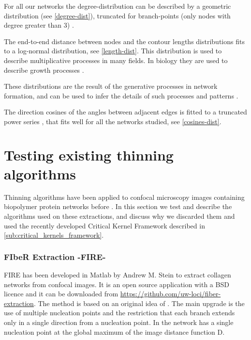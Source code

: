 For all our networks the degree-distribution can be described by a geometric distribution (see \autoref{degree-dist}), truncated for branch-points (only nodes with degree greater than 3) .

The end-to-end distance between nodes and the contour lengths distributions fits to a
log-normal distribution, see \autoref{length-dist}. This distribution is used to describe multiplicative processes in many fields.
In biology they are used to describe growth processes \cite{mitzenmacher_brief_2004}.

These distributions are the result of the generative processes in network formation, and can be used to infer the details of such processes and patterns \cite{frank_common_2009, frank_how_2014}.

The direction cosines of the angles between adjacent edges is fitted to a truncated power series \cite{lindstrom_finite-strain_2013}, that fits well for all the networks studied, see \autoref{cosines-dist}.


\section{Testing existing thinning algorithms}%
\label{sec:testing_other_thinning_algorithms}

Thinning algorithms have been applied to confocal microscopy images containing biopolymer protein networks before \cite{stein_algorithm_2008, lindstrom_biopolymer_2010}.
In this section we test and describe the algorithms used on these extractions, and discuss why we discarded them and used the recently developed Critical Kernel Framework \cite{bertrand_powerful_2014} described in \autoref{sub:critical_kernels_framework}.

\subsubsection{FIbeR Extraction -FIRE-}
\label{subsub:FIRE}

FIRE has been developed in Matlab by Andrew M. Stein
  \citep{stein_mathematical_2007} to extract collagen networks from confocal
  images. It is an open source application with a BSD licence and it can be downloaded from
  \url{https://github.com/uw-loci/fiber-extraction}. The method
  \citep{stein_algorithm_2008} is based on an original idea of
  \citet{wu_automated_2003}. The main upgrade is the use of multiple nucleation
  points  and the restriction that each branch extends only  in a single
  direction from a nucleation point. In \citet{wu_automated_2003} the network has a single nucleation point at the global maximum of the image distance function D.

